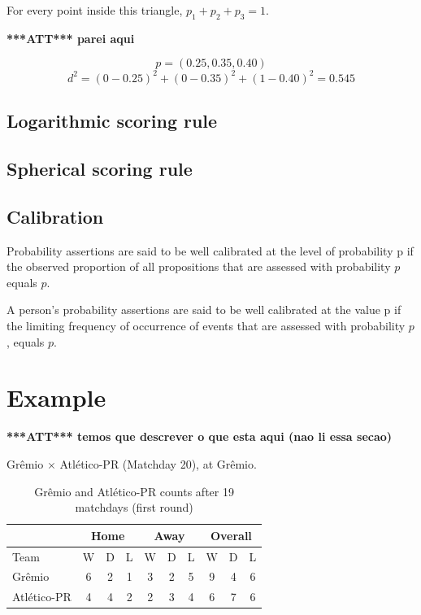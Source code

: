 \documentclass[journal,article,accept,moreauthors,pdftex,12pt,a4paper]{mdpi}
\newcommand{\red}[1]{\textbf{\color{red} ***ATT*** #1}}
\begin{document}
For every point inside this triangle, $p_1+p_2+p_3=1$.

\red{parei aqui}

\[p=(0.25,0.35,0.40)\]
\[d^2=(0-0.25)^2+(0-0.35)^2+(1-0.40)^2=0.545\]



\subsection{Logarithmic scoring rule} 

\subsection{Spherical scoring rule}


\subsection{Calibration}

Probability assertions are said to be well calibrated at the level of probability p if the observed proportion of all propositions that are assessed with probability $p$ equals $p$.

A person's probability assertions are said to be well calibrated at the value p if the limiting frequency of occurrence of events that are assessed with probability $p$, equals $p$.


\section{Example}

\red{temos que descrever o que esta aqui (nao li essa secao)}

Gr\^emio $\times$ Atl\'etico-PR (Matchday 20), at Gr\^emio.

\begin{table}[h]
\begin{center}
\begin{tabular}{lccccccccc}

\hline
 & \multicolumn{3}{c}{Home} & \multicolumn{3}{c}{Away}& \multicolumn{3}{c}{Overall} \\
\hline
\hline
Team & W & D & L & W & D & L & W & D & L\\
\hline
Gr\^emio & 6 & 2 & 1 & 3 & 2 & 5 & 9 & 4 & 6\\
Atl\'etico-PR & 4 & 4 & 2 & 2 & 3 & 4 & 6 & 7 & 6\\
\hline
\end{tabular}
\caption{Gr\^emio and Atl\'etico-PR counts after 19 matchdays (first round)}
\end{center}
\end{table}
\end{document}
